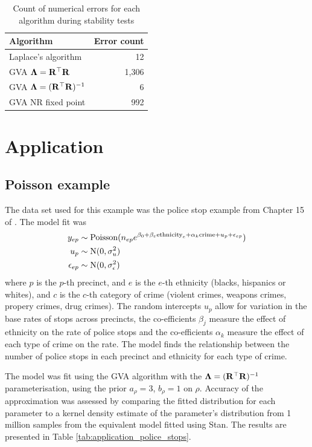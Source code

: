 \documentclass{amsart}[12pt]
\begin{document}
	\begin{table}
		\caption{Count of numerical errors for each algorithm during stability tests}
		\label{tab:stability_results}
		\begin{tabular}{|l|r|}
			\hline
			Algorithm           & Error count \\
			\hline
			Laplace's algorithm & 12          \\
			GVA ${\boldsymbol \Lambda} = {\bf R}^\top {\bf R}$                 & 1,306       \\
			GVA ${\boldsymbol \Lambda} = ({\bf R}^\top {\bf R})^{-1}$              & 6         \\
			GVA NR fixed point              & 992         \\
			\hline
		\end{tabular}
	\end{table}
		
	\section{Application}
	\label{sec:application}

	\subsection{Poisson example}
	The data set used for this example was the police stop example from Chapter 15 of \citep{Gelman2007}.
	The model fit was
	\begin{align*}
		y_{ep} &\sim \text{Poisson}(n_{ep} e^{\beta_0 + \beta_e \text{ethnicity}_e + \alpha_{k} \text{crime} + u_p + \epsilon_{ep}}) \\
		u_p &\sim \text{N}(0, \sigma_u^2) \\
		\epsilon_{ep} &\sim \text{N}(0, \sigma_\epsilon^2) \\
	\end{align*}
	where $p$ is the $p$-th precinct, and $e$ is the $e$-th ethnicity (blacks, hispanics or whites), and $c$ is
	the $c$-th category of crime (violent crimes, weapons crimes, propery crimes, drug crimes). The random 
	intercepts $u_p$ allow for variation in the base rates of stops across precincts,
	the co-efficients $\beta_j$ measure the effect of ethnicity on the rate of police stops and
	the co-efficients $\alpha_k$ measure the effect of each type of crime on the rate.
	The model finds the relationship between the number of police stops in each precinct and 
	ethnicity	for each type of crime.

	The model was fit using the GVA algorithm with the ${\boldsymbol \Lambda} = ({\bf R}^\top {\bf R})^{-1}$ parameterisation, using
	the prior $a_\rho = 3$, $b_\rho = 1$ on $\rho$. Accuracy of the approximation was assessed by comparing the
	fitted distribution for each parameter to a kernel density estimate of the parameter's distribution from
	1 million samples from the equivalent model fitted using Stan. The results are presented in Table
	\ref{tab:application_police_stops}.
\end{document}
